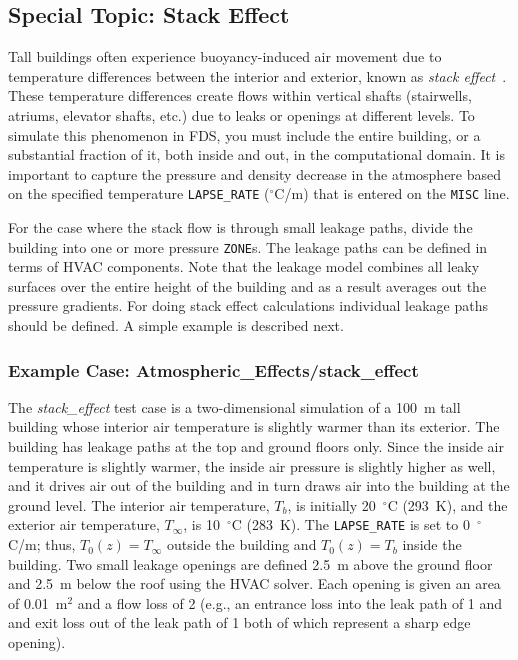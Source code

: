 \documentclass[11pt]{book}
\newcommand{\ct}{\tt\small}
\begin{document}
\subsection{Special Topic: Stack Effect}
\label{info:stackeffect}

Tall buildings often experience buoyancy-induced air movement due to temperature differences between the interior and exterior, known as {\em stack effect}~\cite{Klote_Milke}. These temperature differences create flows within vertical shafts (stairwells, atriums, elevator shafts, etc.) due to leaks or openings at different levels.  To simulate this phenomenon in FDS, you must include the entire building, or a substantial fraction of it, both inside and out, in the computational domain. It
is important to capture the pressure and density decrease in the atmosphere based on the specified temperature {\ct LAPSE\_RATE} ($^\circ$C/m) that is entered on the {\ct MISC} line.

For the case where the stack flow is through small leakage paths, divide the building into one or more pressure {\ct ZONE}s.  The leakage paths can be defined in terms of HVAC components.  Note that the leakage model combines all leaky surfaces over the entire height of the building and as a result averages out the pressure gradients. For doing stack effect calculations individual leakage paths should be defined. A simple example is described next.

\subsubsection{Example Case: Atmospheric\_Effects/stack\_effect}

The {\em stack\_effect} test case is a two-dimensional simulation of a 100~m tall building whose interior air temperature is slightly warmer than its exterior. The building has leakage paths at the top and ground floors only.  Since the inside air temperature is slightly warmer, the inside air pressure is slightly higher as well, and it drives air out of the building and in turn draws air into the building at the ground level.
The interior air temperature, $T_b$, is initially 20~$^\circ$C (293~K), and the exterior air temperature, $T_\infty$, is
10~$^\circ$C (283~K). The {\ct LAPSE\_RATE} is set to 0~$^\circ$C/m; thus, $T_0(z)=T_\infty$ outside the building and $T_0(z)=T_b$ inside the building. Two small leakage openings are defined 2.5~m above the ground floor and 2.5~m below the roof using the HVAC solver.  Each opening is given an area of 0.01~m$^2$ and a flow loss of 2 (e.g., an entrance loss into the leak path of 1 and and exit loss out of the leak path of 1 both of which represent a sharp edge opening).
\end{document}
